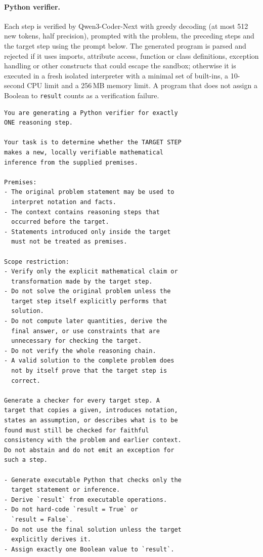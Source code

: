 \paragraph{Python verifier.} Each step is verified by Qwen3-Coder-Next \cite{qwen_qwen3_coder_next_tech_report} with greedy decoding (at most 512 new tokens, half precision), prompted with the problem, the preceding steps and the target step using the prompt below. The generated program is parsed and rejected if it uses imports, attribute access, function or class definitions, exception handling or other constructs that could escape the sandbox; otherwise it is executed in a fresh isolated interpreter with a minimal set of built-ins, a 10-second CPU limit and a 256\,MB memory limit. A program that does not assign a Boolean to \texttt{result} counts as a verification failure.
\begin{small}
\begin{verbatim}
You are generating a Python verifier for exactly
ONE reasoning step.

Your task is to determine whether the TARGET STEP
makes a new, locally verifiable mathematical
inference from the supplied premises.

Premises:
- The original problem statement may be used to
  interpret notation and facts.
- The context contains reasoning steps that
  occurred before the target.
- Statements introduced only inside the target
  must not be treated as premises.

Scope restriction:
- Verify only the explicit mathematical claim or
  transformation made by the target step.
- Do not solve the original problem unless the
  target step itself explicitly performs that
  solution.
- Do not compute later quantities, derive the
  final answer, or use constraints that are
  unnecessary for checking the target.
- Do not verify the whole reasoning chain.
- A valid solution to the complete problem does
  not by itself prove that the target step is
  correct.

Generate a checker for every target step. A
target that copies a given, introduces notation,
states an assumption, or describes what is to be
found must still be checked for faithful
consistency with the problem and earlier context.
Do not abstain and do not emit an exception for
such a step.

- Generate executable Python that checks only the
  target statement or inference.
- Derive `result` from executable operations.
- Do not hard-code `result = True` or
  `result = False`.
- Do not use the final solution unless the target
  explicitly derives it.
- Assign exactly one Boolean value to `result`.


\end{verbatim}
\end{small}
